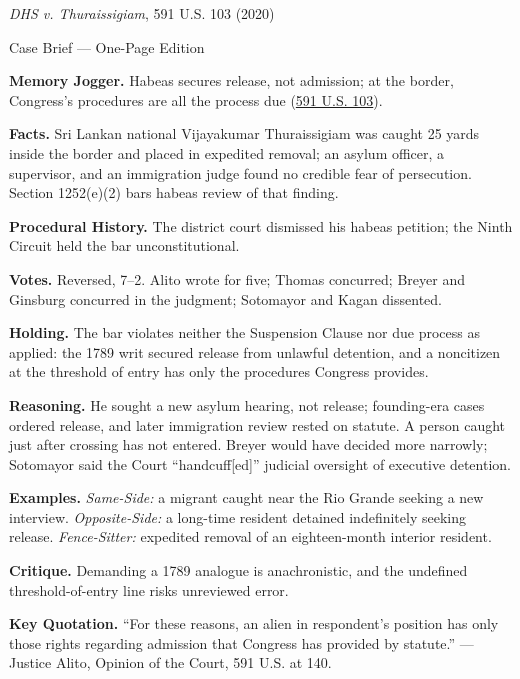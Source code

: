 \documentclass[12pt]{article}
\begin{document}
\begin{center}
{\Large \textit{DHS v. Thuraissigiam}, 591 U.S. 103 (2020)\par}
\vspace{0.3em}
{\normalsize Case Brief --- One-Page Edition\par}
\end{center}

\textbf{Memory Jogger.} Habeas secures release, not admission; at the border, Congress's procedures are all the process due (\href{https://supreme.justia.com/cases/federal/us/591/19-161/}{591 U.S. 103}).

\textbf{Facts.} Sri Lankan national Vijayakumar Thuraissigiam was caught 25 yards inside the border and placed in expedited removal; an asylum officer, a supervisor, and an immigration judge found no credible fear of persecution. Section 1252(e)(2) bars habeas review of that finding.

\textbf{Procedural History.} The district court dismissed his habeas petition; the Ninth Circuit held the bar unconstitutional.

\textbf{Votes.} Reversed, 7--2. Alito wrote for five; Thomas concurred; Breyer and Ginsburg concurred in the judgment; Sotomayor and Kagan dissented.

\textbf{Holding.} The bar violates neither the Suspension Clause nor due process as applied: the 1789 writ secured release from unlawful detention, and a noncitizen at the threshold of entry has only the procedures Congress provides.

\textbf{Reasoning.} He sought a new asylum hearing, not release; founding-era cases ordered release, and later immigration review rested on statute. A person caught just after crossing has not entered. Breyer would have decided more narrowly; Sotomayor said the Court ``handcuff[ed]'' judicial oversight of executive detention.

\textbf{Examples.} \emph{Same-Side:} a migrant caught near the Rio Grande seeking a new interview. \emph{Opposite-Side:} a long-time resident detained indefinitely seeking release. \emph{Fence-Sitter:} expedited removal of an eighteen-month interior resident.

\textbf{Critique.} Demanding a 1789 analogue is anachronistic, and the undefined threshold-of-entry line risks unreviewed error.

\textbf{Key Quotation.} ``For these reasons, an alien in respondent's position has only those rights regarding admission that Congress has provided by statute.'' --- Justice Alito, Opinion of the Court, 591 U.S. at 140.
\end{document}
